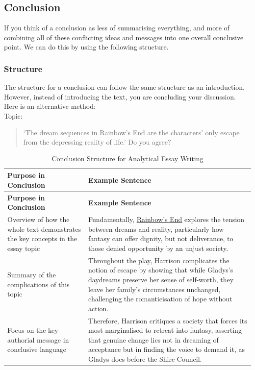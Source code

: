 \documentclass[a4paper]{article}
\begin{document}
\newpage

\subsection{Conclusion}
If you think of a conclusion as less of summarising everything, and more of combining all of these
conflicting ideas and messages into one overall conclusive point. We can do this by using the following structure.

\subsubsection{Structure}
The structure for a conclusion can follow the same structure as an introduction. However, instead of introducing the text, you are concluding your discussion.\\

Here is an alternative method:\\


Topic:
\begin{quote}
    `The dream sequences in \underline{Rainbow's End} are the characters' only escape from the depressing reality of life.' Do you agree?
\end{quote}


\begin{longtable}{|p{3cm}|p{5.25cm}|}
\caption{Conclusion Structure for Analytical Essay Writing} \label{tab:conclusionstructure} \\
\hline
\textbf{Purpose in Conclusion} & \textbf{Example Sentence} \\
\hline
\endfirsthead

\hline
\textbf{Purpose in Conclusion} & \textbf{Example Sentence} \\
\hline
\endhead

\hline
\endfoot

Overview of how the whole text demonstrates the key concepts in the essay topic
&
Fundamentally, \underline{Rainbow's End} explores the tension between dreams and reality, particularly how fantasy can offer dignity, but not deliverance, to those denied opportunity by an unjust society. \\
\hline

Summary of the complications of this topic
&
Throughout the play, Harrison complicates the notion of escape by showing that while Gladys’s daydreams preserve her sense of self-worth, they leave her family’s circumstances unchanged, challenging the romanticisation of hope without action. \\
\hline

Focus on the key authorial message in conclusive language
&
Therefore, Harrison critiques a society that forces its most marginalised to retreat into fantasy, asserting that genuine change lies not in dreaming of acceptance but in finding the voice to demand it, as Gladys does before the Shire Council. \\
\hline

\end{longtable}
\end{document}
